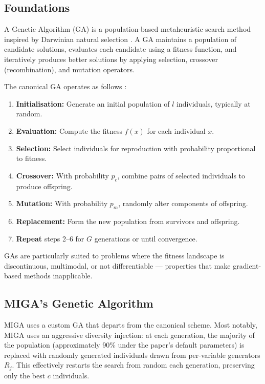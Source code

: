 \subsection{Foundations}

A Genetic Algorithm (GA) is a population-based metaheuristic search method inspired by Darwinian natural selection \cite{Holland1975}. A GA maintains a population of candidate solutions, evaluates each candidate using a fitness function, and iteratively produces better solutions by applying selection, crossover (recombination), and mutation operators.

The canonical GA operates as follows \cite{Goldberg1989}:

\begin{enumerate}
    \item \textbf{Initialisation:} Generate an initial population of $l$ individuals, typically at random.
    \item \textbf{Evaluation:} Compute the fitness $f(x)$ for each individual $x$.
    \item \textbf{Selection:} Select individuals for reproduction with probability proportional to fitness.
    \item \textbf{Crossover:} With probability $p_c$, combine pairs of selected individuals to produce offspring.
    \item \textbf{Mutation:} With probability $p_m$, randomly alter components of offspring.
    \item \textbf{Replacement:} Form the new population from survivors and offspring.
    \item \textbf{Repeat} steps 2--6 for $G$ generations or until convergence.
\end{enumerate}

GAs are particularly suited to problems where the fitness landscape is discontinuous, multimodal, or not differentiable --- properties that make gradient-based methods inapplicable.

\subsection{MIGA's Genetic Algorithm}

MIGA \cite{FigueroaGarcia2023} uses a custom GA that departs from the canonical scheme. Most notably, MIGA uses an aggressive diversity injection: at each generation, the majority of the population (approximately 90\% under the paper's default parameters) is replaced with randomly generated individuals drawn from per-variable generators $R_j$. This effectively restarts the search from random each generation, preserving only the best $c$ individuals.

